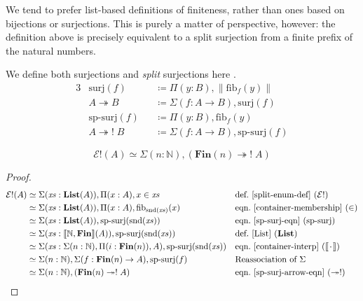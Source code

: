 We tend to prefer list-based definitions of finiteness, rather than ones based
on bijections or surjections.
This is purely a matter of perspective, however: the definition above is
precisely equivalent to a split surjection from a finite prefix of the natural
numbers.
\begin{definition}[Surjections] \label{surjections}
  We define both surjections and \emph{split} surjections here \cite[definition
  4.6.1]{hottbook}.
  \begin{alignat}{3}
    &\text{surj}(f)             &&\coloneqq \Pi(y : B) , \lVert \text{fib}_f(y) \rVert \\
    &A \twoheadrightarrow B     &&\coloneqq \Sigma (f : A \rightarrow B) , \text{surj}(f) \label{surj-arrow-eqn} \\
    &\text{sp-surj}(f)          &&\coloneqq \Pi(y : B) , \text{fib}_f(y) \label{sp-surj-eqn} \\
    &A \twoheadrightarrow! \; B &&\coloneqq \Sigma (f : A \rightarrow B) , \text{sp-surj}(f) \label{sp-surj-arrow-eqn}
  \end{alignat}
\end{definition}
\begin{lemma} \label{split-enum-is-split-surj}
  \begin{equation}
    \mathcal{E}!(A) \simeq \Sigma (n : \mathbb{N}) , \left( \mathbf{Fin}(n) \twoheadrightarrow ! \; A \right)
  \end{equation}
\end{lemma}
\begin{proof}
  \begin{align*}
    \mathcal{E}!(A)
    & \simeq \Sigma (\mathit{xs} : \textbf{List}(A)) , \Pi {(x : A)} , x \in \mathit{xs}
    && \text{def.~\ref{split-enum-def} }(\mathcal{E}!)
    \\
    & \simeq \Sigma (\mathit{xs} : \textbf{List}(A)) , \Pi {(x : A)} , \text{fib}_{\text{snd}(\mathit{xs})}(x)
    && \text{eqn.~\ref{container-membership} } (\in)
    \\
    & \simeq \Sigma (\mathit{xs} : \textbf{List}(A)) , \text{sp-surj}(\text{snd}(\mathit{xs}))
    && \text{eqn.~\ref{sp-surj-eqn} (sp-surj)}
    \\
    & \simeq \Sigma (\mathit{xs} : \llbracket \mathbb{N} , \mathbf{Fin} \rrbracket (A)) , \text{sp-surj}(\text{snd}(\mathit{xs}))
    && \text{def.~\ref{List} } (\mathbf{List})
    \\
    & \simeq \Sigma (\mathit{xs} : \Sigma (n : \mathbb{N}) , \Pi (i : \mathbf{Fin}(n)) , A) , \text{sp-surj}(\text{snd}(\mathit{xs}))
    && \text{eqn.~\ref{container-interp} } (\llbracket {\mkern 2mu\cdot\mkern 2mu} \rrbracket)
    \\
    & \simeq \Sigma (n : \mathbb{N}) , \Sigma (f : \mathbf{Fin}(n) \rightarrow A) , \text{sp-surj}(f)
    && \text{Reassociation of } \Sigma
    \\
    & \simeq \Sigma (n : \mathbb{N}) , ( \mathbf{Fin}(n) \twoheadrightarrow ! \; A )
    && \text{eqn.~\ref{sp-surj-arrow-eqn} } (\twoheadrightarrow!)
  \end{align*}
\end{proof}

